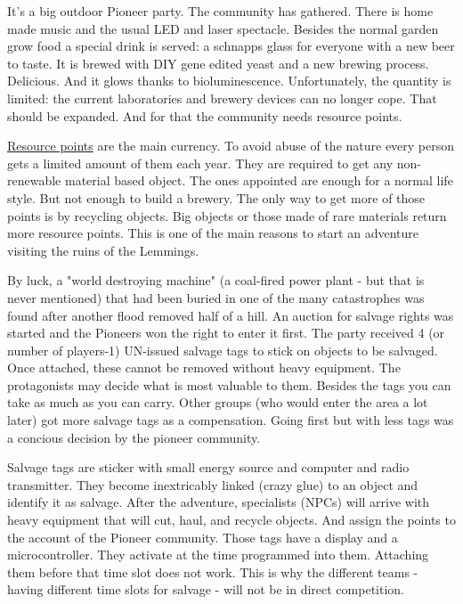 It's a big outdoor Pioneer party. The community has gathered. There is home made music and the usual LED and laser spectacle. Besides the normal garden grow food a special drink is served: a schnapps glass for everyone with a new beer to taste.
It is brewed with DIY gene edited yeast and a new brewing process. Delicious. And it glows thanks to bioluminescence. Unfortunately, the quantity is limited: the current laboratories and brewery devices can no longer cope. That should be expanded. And for that the community needs resource points.

\begin{sidebarBox}[title=Resource points]
\hyperref[sec:Resource points]{Resource points} are the main currency. To avoid abuse of the nature every person gets a limited amount of them each year. They are required to get any non-renewable  material based object. The ones appointed are enough for a normal life style. But not enough to build a brewery. The only way to get more of those points is by recycling objects. Big objects or those made of rare materials return more resource points. This is one of the main reasons to start an adventure visiting the ruins of the Lemmings. 
\end{sidebarBox}

By luck, a "world destroying machine" (a coal-fired power plant - but that is never mentioned) that had been buried in one of the many catastrophes was found after another flood removed half of a hill. An auction for salvage rights was started and the Pioneers won the right to enter it first.
The party received 4 (or number of players-1) UN-issued salvage tags to stick on objects to be salvaged. Once attached, these cannot be removed without heavy equipment. The protagonists may decide what is most valuable to them. Besides the tags you can take as much as you can carry.
Other groups (who would enter the area a lot later) got more salvage tags as a compensation. Going first but with less tags was a concious decision by the pioneer community.

\begin{sidebarBox}[title=Salvage tags]
Salvage tags are sticker with small energy source and computer and radio transmitter. They become inextricably linked (crazy glue) to an object and identify it as salvage. After the adventure, specialists (NPCs) will arrive with heavy equipment that will cut, haul, and recycle objects. And assign the points to the account of the Pioneer community.
Those tags have a display and a microcontroller. They activate at the time programmed into them. Attaching them before that time slot does not work. This is why the different teams - having different time slots for salvage - will not be in direct competition.
\end{sidebarBox}

